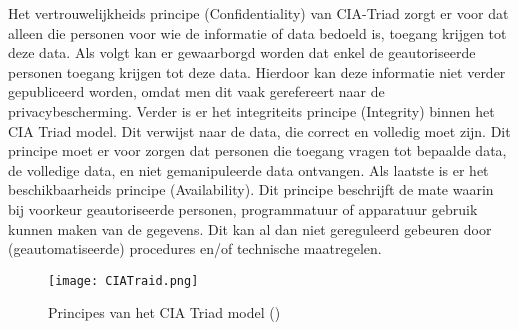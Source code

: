 \newline
Het vertrouwelijkheids principe (Confidentiality) van CIA-Triad zorgt er voor dat alleen die personen voor wie de informatie of data bedoeld is, toegang krijgen tot deze data. Als volgt kan er gewaarborgd worden dat enkel de geautoriseerde personen toegang krijgen tot deze data. Hierdoor kan deze informatie niet verder gepubliceerd worden, omdat men dit vaak gerefereert naar de privacybescherming. 
\newline
Verder is er het integriteits principe (Integrity) binnen het CIA Triad model. Dit verwijst naar de data, die correct en volledig moet zijn. Dit principe moet er voor zorgen dat personen die toegang vragen tot bepaalde data, de volledige data, en niet gemanipuleerde data ontvangen. 
\newpage
{}
\newline
Als laatste is er het beschikbaarheids principe (Availability). Dit principe beschrijft de mate waarin bij voorkeur geautoriseerde personen, programmatuur of apparatuur gebruik kunnen maken van de gegevens. Dit kan al dan niet gereguleerd gebeuren door (geautomatiseerde) procedures en/of technische maatregelen. 

\begin{figure}[H]
	\centering
	\texttt{[image: CIATraid.png]}
	\caption{Principes van het CIA Triad model (\cite{PrincipesCIA})}
	\label{fig:CIATraid}
\end{figure}

